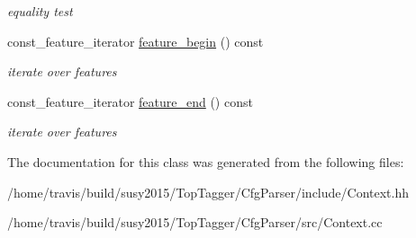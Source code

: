 \begin{DoxyCompactItemize}
\begin{DoxyCompactList}\small\item\em equality test \end{DoxyCompactList}\item 
\hypertarget{classcfg_1_1Context_a73d0f54c4f2dec91050b6f87ff93e93b}{const\-\_\-feature\-\_\-iterator \hyperlink{classcfg_1_1Context_a73d0f54c4f2dec91050b6f87ff93e93b}{feature\-\_\-begin} () const }\label{classcfg_1_1Context_a73d0f54c4f2dec91050b6f87ff93e93b}

\begin{DoxyCompactList}\small\item\em iterate over features \end{DoxyCompactList}\item 
\hypertarget{classcfg_1_1Context_a81e81c5c13fef2656ea8843f0948a6f6}{const\-\_\-feature\-\_\-iterator \hyperlink{classcfg_1_1Context_a81e81c5c13fef2656ea8843f0948a6f6}{feature\-\_\-end} () const }\label{classcfg_1_1Context_a81e81c5c13fef2656ea8843f0948a6f6}

\begin{DoxyCompactList}\small\item\em iterate over features \end{DoxyCompactList}\end{DoxyCompactItemize}


The documentation for this class was generated from the following files\-:\begin{DoxyCompactItemize}
\item 
/home/travis/build/susy2015/\-Top\-Tagger/\-Cfg\-Parser/include/Context.\-hh\item 
/home/travis/build/susy2015/\-Top\-Tagger/\-Cfg\-Parser/src/Context.\-cc\end{DoxyCompactItemize}
